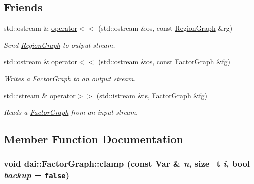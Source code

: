 \subsection*{Friends}
\begin{CompactItemize}
\item 
\hypertarget{classdai_1_1RegionGraph_177194e1a32e016c3b59376443e9dcc1}{
std::ostream \& \hyperlink{classdai_1_1RegionGraph_177194e1a32e016c3b59376443e9dcc1}{operator$<$$<$} (std::ostream \&os, const \hyperlink{classdai_1_1RegionGraph}{RegionGraph} \&rg)}
\label{classdai_1_1RegionGraph_177194e1a32e016c3b59376443e9dcc1}

\begin{CompactList}\small\item\em Send \hyperlink{classdai_1_1RegionGraph}{RegionGraph} to output stream. \item\end{CompactList}\item 
\hypertarget{classdai_1_1FactorGraph_c2f9ce21f6b9947b11c2bd731bb882d9}{
std::ostream \& \hyperlink{classdai_1_1FactorGraph_c2f9ce21f6b9947b11c2bd731bb882d9}{operator$<$$<$} (std::ostream \&os, const \hyperlink{classdai_1_1FactorGraph}{FactorGraph} \&fg)}
\label{classdai_1_1FactorGraph_c2f9ce21f6b9947b11c2bd731bb882d9}

\begin{CompactList}\small\item\em Writes a \hyperlink{classdai_1_1FactorGraph}{FactorGraph} to an output stream. \item\end{CompactList}\item 
\hypertarget{classdai_1_1FactorGraph_5b4639a278afc734c0d4b074f53d87b5}{
std::istream \& \hyperlink{classdai_1_1FactorGraph_5b4639a278afc734c0d4b074f53d87b5}{operator$>$$>$} (std::istream \&is, \hyperlink{classdai_1_1FactorGraph}{FactorGraph} \&fg)}
\label{classdai_1_1FactorGraph_5b4639a278afc734c0d4b074f53d87b5}

\begin{CompactList}\small\item\em Reads a \hyperlink{classdai_1_1FactorGraph}{FactorGraph} from an input stream. \item\end{CompactList}\end{CompactItemize}


\subsection{Member Function Documentation}
\hypertarget{classdai_1_1FactorGraph_3cb7d91ca96090372bd0aacbf70a8948}{
\subsubsection[clamp]{\setlength{\rightskip}{0pt plus 5cm}void dai::FactorGraph::clamp (const {\bf Var} \& {\em n}, \/  size\_\-t {\em i}, \/  bool {\em backup} = {\tt false})}}
\label{classdai_1_1FactorGraph_3cb7d91ca96090372bd0aacbf70a8948}


